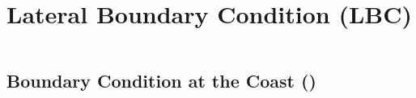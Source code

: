 \documentclass[NEMO_book]{subfiles}
\begin{document}
\chapter{Lateral Boundary Condition (LBC) }
\label{LBC}
\minitoc

\newpage
$\ $\newline    %



\section{Boundary Condition at the Coast ()}
\label{LBC_coast}


\end{document}
